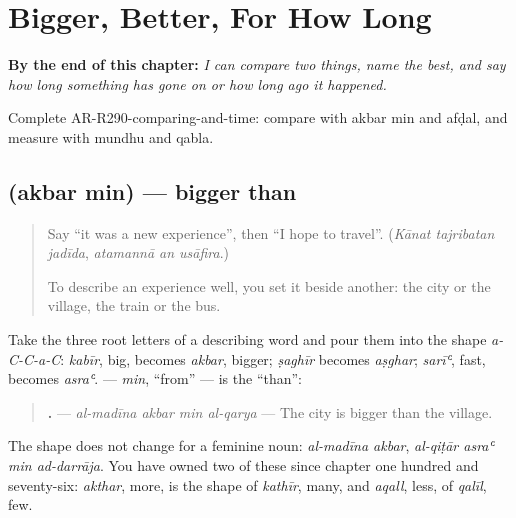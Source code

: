 
\chapter{Bigger, Better, For How Long}
\label{ch:ar-bigger-better-for-how-long}

\begin{chapteropening}
\textbf{By the end of this chapter:} \emph{I can compare two things, name the best, and say how long something has gone on or how long ago it happened.}

Complete AR-R290-comparing-and-time: compare with akbar min and afḍal, and measure with mundhu and qabla.
\end{chapteropening}

\section[\texorpdfstring{\ar{أكبر} \ar{من} (akbar min)}{أكبر من (akbar min)}]{  (akbar min) — bigger than}

\label{lesson:AR-C290-akbar-min}



\begin{quote}
Say \textquotedblleft{}it was a new experience\textquotedblright{}, then \textquotedblleft{}I hope to travel\textquotedblright{}. (\emph{Kānat tajribatan jadīda}, \emph{atamannā an usāfira}.)

To describe an experience well, you set it beside another: the city or the village, the train or the bus.
\end{quote}

\begin{grammarlens}[title={Grammar Lens: the shape aCCaC, and min}]
Take the three root letters of a describing word and pour them into the shape \emph{a-C-C-a-C}: \emph{kabīr}, big, becomes \textbf{} \emph{akbar}, bigger; \emph{ṣaghīr} becomes \emph{aṣghar}; \emph{sarīʿ}, fast, becomes \emph{asraʿ}. \textbf{} — \emph{min}, \textquotedblleft{}from\textquotedblright{} — is the \textquotedblleft{}than\textquotedblright{}:

\begin{quote}
\textbf{   .} — \emph{al-madīna akbar min al-qarya} — The city is bigger than the village.
\end{quote}

The shape does not change for a feminine noun: \emph{al-madīna akbar}, \emph{al-qiṭār asraʿ min ad-darrāja}. You have owned two of these since chapter one hundred and seventy-six: \emph{akthar}, more, is the shape of \emph{kathīr}, many, and \emph{aqall}, less, of \emph{qalīl}, few.
\end{grammarlens}

